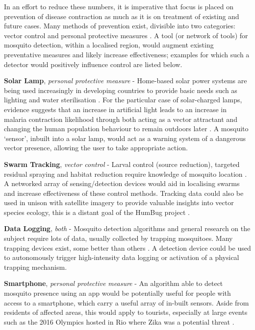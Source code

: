         In an effort to reduce these numbers, it is imperative that focus is placed on prevention of disease contraction as much as it is on treatment of existing and future cases. Many methods of prevention exist, divisible into two categories: vector control and personal protective measures \cite{Caraballo2014}. A tool (or network of tools) for mosquito detection, within a localised region, would augment existing preventative measures and likely increase effectiveness; examples for which such a detector would positively influence control are listed below.
        \begin{sitemize}
            \item{\textbf{Solar Lamp}, \textit{personal protective measure} - Home-based solar power systems are being used increasingly in developing countries to provide basic needs such as lighting and water sterilisation \cite{Akikur2013}. For the particular case of solar-charged lamps, evidence suggests that an increase in artificial light leads to an increase in malaria contraction likelihood through both acting as a vector attractant and changing the human population behaviour to remain outdoors later  \cite{Barghini2010}. A mosquito `sensor', inbuilt into a solar lamp, would act as a warning system of a dangerous vector presence, allowing the user to take appropriate action.}
            \item{\textbf{Swarm Tracking}, \textit{vector control} - Larval control (source reduction), targeted residual spraying and habitat reduction require knowledge of mosquito location \cite{Caraballo2014,Pates2005,WHOVectorControl2016}. A networked array of sensing/detection devices would aid in localising swarms and increase effectiveness of these control methods. Tracking data could also be used in unison with satellite imagery to provide valuable insights into vector species ecology, this is a distant goal of the HumBug project \cite{HumBug2016}.}
            \item{\textbf{Data Logging}, \textit{both} - Mosquito detection algorithms and general research on the subject require lots of data, usually collected by trapping mosquitoes. Many trapping devices exist, some better than others \cite{Luhken2014}. A detection device could be used to autonomously trigger high-intensity data logging or activation of a physical trapping mechanism.}
            \item{\textbf{Smartphone}, \textit{personal protective measure} - An algorithm able to detect mosquito presence using an app would be potentially useful for people with access to a smartphone, which carry a useful array of in-built sensors. Aside from residents of affected areas, this would apply to tourists, especially at large events such as the 2016 Olympics hosted in Rio where Zika was a potential threat \cite{Petersen2016}.}

\end{sitemize}
